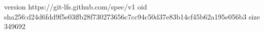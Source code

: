 version https://git-lfs.github.com/spec/v1
oid sha256:d24d6fdd9f5e03ffb28f730273656c7cc94c50d37e83b14cf45b62a195e056b3
size 349692
